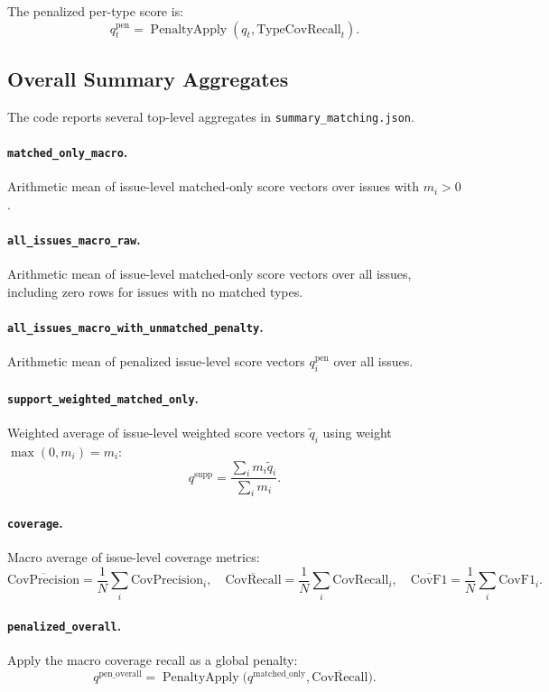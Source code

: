 \documentclass[11pt]{article}
\begin{document}
The penalized per-type score is:
\[
q^{\mathrm{pen}}_t = \operatorname{PenaltyApply}(q_t,\mathrm{TypeCovRecall}_t).
\]

\subsection{Overall Summary Aggregates}
The code reports several top-level aggregates in \texttt{summary\_matching.json}.

\paragraph{\texttt{matched\_only\_macro}.}
Arithmetic mean of issue-level matched-only score vectors over issues with $m_i>0$.

\paragraph{\texttt{all\_issues\_macro\_raw}.}
Arithmetic mean of issue-level matched-only score vectors over all issues, including zero rows for issues with no matched types.

\paragraph{\texttt{all\_issues\_macro\_with\_unmatched\_penalty}.}
Arithmetic mean of penalized issue-level score vectors $q^{\mathrm{pen}}_i$ over all issues.

\paragraph{\texttt{support\_weighted\_matched\_only}.}
Weighted average of issue-level weighted score vectors $\widetilde{q}_i$ using weight $\max(0,m_i)=m_i$:
\[
q^{\mathrm{supp}}=\frac{\sum_i m_i \widetilde{q}_i}{\sum_i m_i}.
\]

\paragraph{\texttt{coverage}.}
Macro average of issue-level coverage metrics:
\[
\overline{\mathrm{CovPrecision}}=\frac{1}{N}\sum_i \mathrm{CovPrecision}_i,\quad
\overline{\mathrm{CovRecall}}=\frac{1}{N}\sum_i \mathrm{CovRecall}_i,\quad
\overline{\mathrm{CovF1}}=\frac{1}{N}\sum_i \mathrm{CovF1}_i.
\]

\paragraph{\texttt{penalized\_overall}.}
Apply the macro coverage recall as a global penalty:
\[
q^{\mathrm{pen\_overall}}=
\operatorname{PenaltyApply}\bigl(q^{\mathrm{matched\_only}},\overline{\mathrm{CovRecall}}\bigr).
\]
\end{document}
